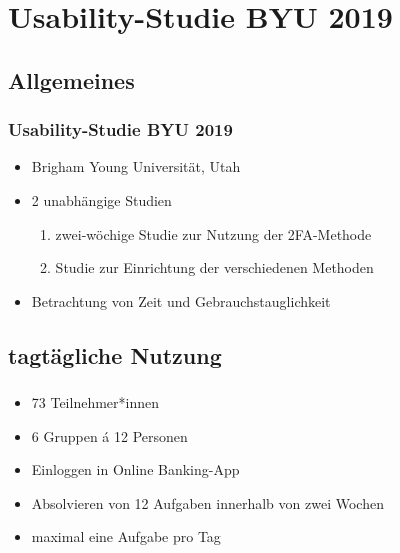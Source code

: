 \section{Usability-Studie BYU 2019}

\subsection*{Allgemeines}
\begin{frame}
    \frametitle{Usability-Studie BYU 2019}
    \begin{itemize}
        \item Brigham Young Universität, Utah
        \item 2 unabhängige Studien
        \begin{enumerate}
            \item zwei-wöchige Studie zur Nutzung der 2FA-Methode
            \item Studie zur Einrichtung der verschiedenen Methoden
        \end{enumerate}
        \item Betrachtung von Zeit und Gebrauchstauglichkeit
    \end{itemize}
\end{frame}

\subsection{tagtägliche Nutzung}
\begin{frame}
    \frametitle{\currentsectionname}
    \begin{itemize}
        \item 73 Teilnehmer*innen
        \item 6 Gruppen \'{a} 12 Personen
        \item Einloggen in Online Banking-App
        \item Absolvieren von 12 Aufgaben innerhalb von zwei Wochen
        \item maximal eine Aufgabe pro Tag
    \end{itemize}
\end{frame}

